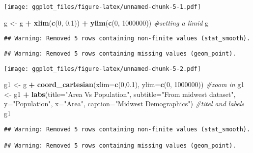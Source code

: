 \documentclass[]{article}
\newenvironment{Shaded}{\begin{snugshade}}{\end{snugshade}}
\newcommand{\KeywordTok}[1]{\textcolor[rgb]{0.13,0.29,0.53}{\textbf{#1}}}
\newcommand{\DataTypeTok}[1]{\textcolor[rgb]{0.13,0.29,0.53}{#1}}
\newcommand{\DecValTok}[1]{\textcolor[rgb]{0.00,0.00,0.81}{#1}}
\newcommand{\FloatTok}[1]{\textcolor[rgb]{0.00,0.00,0.81}{#1}}
\newcommand{\StringTok}[1]{\textcolor[rgb]{0.31,0.60,0.02}{#1}}
\newcommand{\CommentTok}[1]{\textcolor[rgb]{0.56,0.35,0.01}{\textit{#1}}}
\newcommand{\OperatorTok}[1]{\textcolor[rgb]{0.81,0.36,0.00}{\textbf{#1}}}
\newcommand{\NormalTok}[1]{#1}
\begin{document}
\texttt{[image: ggplot\_files/figure-latex/unnamed-chunk-5-1.pdf]}

\begin{Shaded}
\begin{Highlighting}[]
\NormalTok{g <-}\StringTok{ }\NormalTok{g }\OperatorTok{+}\StringTok{ }\KeywordTok{xlim}\NormalTok{(}\KeywordTok{c}\NormalTok{(}\DecValTok{0}\NormalTok{, }\FloatTok{0.1}\NormalTok{)) }\OperatorTok{+}\StringTok{ }\KeywordTok{ylim}\NormalTok{(}\KeywordTok{c}\NormalTok{(}\DecValTok{0}\NormalTok{, }\DecValTok{1000000}\NormalTok{)) }\CommentTok{#setting a limid}
\NormalTok{g}
\end{Highlighting}
\end{Shaded}

\begin{verbatim}
## Warning: Removed 5 rows containing non-finite values (stat_smooth).
\end{verbatim}

\begin{verbatim}
## Warning: Removed 5 rows containing missing values (geom_point).
\end{verbatim}

\texttt{[image: ggplot\_files/figure-latex/unnamed-chunk-5-2.pdf]}

\begin{Shaded}
\begin{Highlighting}[]
\NormalTok{g1 <-}\StringTok{ }\NormalTok{g }\OperatorTok{+}\StringTok{ }\KeywordTok{coord_cartesian}\NormalTok{(}\DataTypeTok{xlim=}\KeywordTok{c}\NormalTok{(}\DecValTok{0}\NormalTok{,}\FloatTok{0.1}\NormalTok{), }\DataTypeTok{ylim=}\KeywordTok{c}\NormalTok{(}\DecValTok{0}\NormalTok{, }\DecValTok{1000000}\NormalTok{)) }\CommentTok{#zoom in}
\NormalTok{g1 <-}\StringTok{ }\NormalTok{g1 }\OperatorTok{+}\StringTok{ }\KeywordTok{labs}\NormalTok{(}\DataTypeTok{title=}\StringTok{"Area Vs Population"}\NormalTok{, }\DataTypeTok{subtitle=}\StringTok{"From midwest dataset"}\NormalTok{, }\DataTypeTok{y=}\StringTok{"Population"}\NormalTok{, }\DataTypeTok{x=}\StringTok{"Area"}\NormalTok{, }\DataTypeTok{caption=}\StringTok{"Midwest Demographics"}\NormalTok{)                    }\CommentTok{#titel and labels}
\NormalTok{g1}
\end{Highlighting}
\end{Shaded}

\begin{verbatim}
## Warning: Removed 5 rows containing non-finite values (stat_smooth).

## Warning: Removed 5 rows containing missing values (geom_point).
\end{verbatim}
\end{document}
